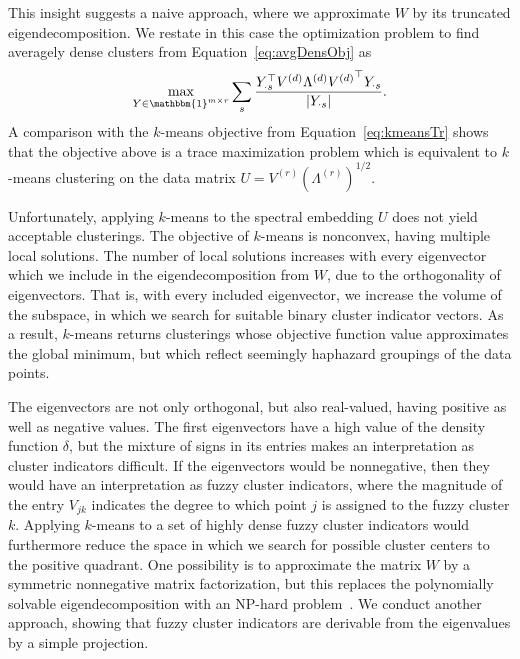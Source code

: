  This insight suggests a naive approach, where we approximate $W$ by its truncated eigendecomposition. We restate in this case the optimization problem to find averagely dense clusters from Equation~\eqref{eq:avgDensObj} as
\begin{align}\label{eq:approxTrunc}
\max_{Y\in\mathbbm{1}^{m\times r}} \sum_s \frac{Y_{\cdot s}^\top V^{(d)}\Lambda^{(d)} {V^{(d)}}^\top Y_{\cdot s}}{|Y_{\cdot s}|}.
\end{align}
A comparison with the $k$-means objective from Equation~\eqref{eq:kmeansTr} shows that the objective above is a trace maximization problem which is equivalent to $k$-means clustering on the data matrix $U=V^{(r)}\left(\Lambda^{(r)}\right)^{1/2}$. 

Unfortunately, applying $k$-means to the spectral embedding $U$ does not yield acceptable clusterings. The objective of $k$-means is nonconvex, having multiple local solutions. The number of local solutions increases with every eigenvector which we include in the eigendecomposition from $W$, due to the orthogonality of eigenvectors. That is, with every included eigenvector, we increase the volume of the subspace, in which we search for suitable binary cluster indicator vectors. As a result, $k$-means returns clusterings whose objective function value approximates the global minimum, but which reflect seemingly haphazard groupings of the data points.

The eigenvectors are not only orthogonal, but also real-valued, having positive as well as negative values. The first eigenvectors have a high value of the density function $\delta$, but the mixture of signs in its entries makes an interpretation as cluster indicators difficult. If the eigenvectors would be nonnegative, then they would have an interpretation as fuzzy cluster indicators, where the magnitude of the entry $V_{jk}$ indicates the degree to which point $j$ is assigned to the fuzzy cluster $k$. Applying $k$-means to a set of highly dense fuzzy cluster indicators would furthermore reduce the space in which we search for possible cluster centers to the positive quadrant. One possibility is to approximate the matrix $W$ by a symmetric nonnegative matrix factorization, but this replaces the polynomially solvable eigendecomposition with an NP-hard problem~\cite{vavasis2009complexity}. 
We conduct another approach, showing that fuzzy cluster indicators are derivable from the eigenvalues by a simple projection.

